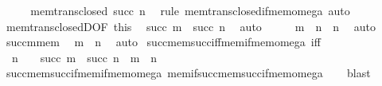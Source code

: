 \begin{isabellebody}
\ {\isacharminus}{\kern0pt}\isanewline
\ \ \isamarkupfalse%
\ {\isachardoublequoteopen}mem{\isacharunderscore}{\kern0pt}trans{\isacharunderscore}{\kern0pt}closed\ {\isacharparenleft}{\kern0pt}succ\ n{\isacharparenright}{\kern0pt}{\isachardoublequoteclose}\ \isamarkupfalse%
\ {\isacharparenleft}{\kern0pt}rule\ mem{\isacharunderscore}{\kern0pt}trans{\isacharunderscore}{\kern0pt}closed{\isacharunderscore}{\kern0pt}if{\isacharunderscore}{\kern0pt}mem{\isacharunderscore}{\kern0pt}omega{\isacharparenright}{\kern0pt}\ auto\isanewline
\ \ \isamarkupfalse%
\ mem{\isacharunderscore}{\kern0pt}trans{\isacharunderscore}{\kern0pt}closedD{\isacharbrackleft}{\kern0pt}OF\ this{\isacharbrackright}{\kern0pt}\ \isamarkupfalse%
\ {\isachardoublequoteopen}succ\ m\ {\isasymsubseteq}\ succ\ n{\isachardoublequoteclose}\ \isamarkupfalse%
\ auto\isanewline
\ \ \isamarkupfalse%
\ \isamarkupfalse%
\ {\isachardoublequoteopen}m\ {\isasymin}\ {\isacharparenleft}{\kern0pt}n\ {\isasymunion}\ {\isacharbraceleft}{\kern0pt}n{\isacharbraceright}{\kern0pt}{\isacharparenright}{\kern0pt}{\isachardoublequoteclose}\ \isamarkupfalse%
\ auto\isanewline
\ \ \isamarkupfalse%
\ succ{\isacharunderscore}{\kern0pt}m{\isacharunderscore}{\kern0pt}mem\ \isamarkupfalse%
\ {\isachardoublequoteopen}m\ {\isasymin}\ n{\isachardoublequoteclose}\ \isamarkupfalse%
\ auto\isanewline
{}\isamarkupfalse%
%
\endisatagproof
{\isafoldproof}%
%
\isadelimproof
\isanewline
%
\endisadelimproof
\isanewline
{}\isamarkupfalse%
\ succ{\isacharunderscore}{\kern0pt}mem{\isacharunderscore}{\kern0pt}succ{\isacharunderscore}{\kern0pt}iff{\isacharunderscore}{\kern0pt}mem{\isacharunderscore}{\kern0pt}if{\isacharunderscore}{\kern0pt}mem{\isacharunderscore}{\kern0pt}omega\ {\isacharbrackleft}{\kern0pt}iff{\isacharbrackright}{\kern0pt}{\isacharcolon}{\kern0pt}\isanewline
\ \ {\isachardoublequoteopen}n\ {\isasymin}\ {\isasymomega}\ {\isasymLongrightarrow}\ succ\ m\ {\isasymin}\ succ\ n\ {\isasymlongleftrightarrow}\ m\ {\isasymin}\ n{\isachardoublequoteclose}\isanewline
%
\isadelimproof
\ \ %
\endisadelimproof
%
\isatagproof
{}\isamarkupfalse%
\ succ{\isacharunderscore}{\kern0pt}mem{\isacharunderscore}{\kern0pt}succ{\isacharunderscore}{\kern0pt}if{\isacharunderscore}{\kern0pt}mem{\isacharunderscore}{\kern0pt}if{\isacharunderscore}{\kern0pt}mem{\isacharunderscore}{\kern0pt}omega\ mem{\isacharunderscore}{\kern0pt}if{\isacharunderscore}{\kern0pt}succ{\isacharunderscore}{\kern0pt}mem{\isacharunderscore}{\kern0pt}succ{\isacharunderscore}{\kern0pt}if{\isacharunderscore}{\kern0pt}mem{\isacharunderscore}{\kern0pt}omega\isanewline
\ \ \isamarkupfalse%
\ blast%
\endisatagproof
{\isafoldproof}%
%
\isadelimproof
\isanewline
%
\endisadelimproof
\isanewline
%
\isadelimtheory
\isanewline
%
\endisadelimtheory
%
\isatagtheory
{}\isamarkupfalse%
%
\endisatagtheory
{\isafoldtheory}%
%
\isadelimtheory
%
\endisadelimtheory
%
\end{isabellebody}%
